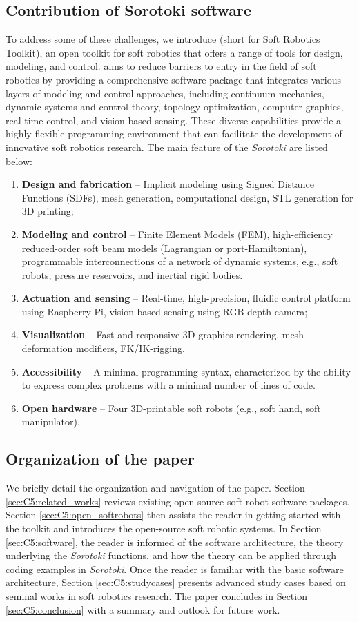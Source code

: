 \subsection{Contribution of Sorotoki software}
To address some of these challenges, we introduce \sorotoki (short for Soft Robotics Toolkit), an open \matlab toolkit for soft robotics that offers a range of tools for design, modeling, and control. \sorotoki aims to reduce barriers to entry in the field of soft robotics by providing a comprehensive software package that integrates various layers of modeling and control approaches, including continuum mechanics, dynamic systems and control theory, topology optimization, computer graphics, real-time control, and vision-based sensing. These diverse capabilities provide a highly flexible programming environment that can facilitate the development of innovative soft robotics research. The main feature of the \textit{Sorotoki} are listed below:
%
\begin{enumerate}
    \setlength\itemsep{0.0em}
    \item \textbf{Design and fabrication} -- Implicit modeling using Signed Distance Functions (SDFs), mesh generation, computational design, STL generation for 3D printing;
    \item \textbf{Modeling and control} -- Finite Element Models (FEM), high-efficiency reduced-order soft beam models (Lagrangian or port-Hamiltonian), programmable interconnections of a network of dynamic systems, e.g., soft robots, pressure reservoirs, and inertial rigid bodies.
    \item \textbf{Actuation and sensing} -- Real-time, high-precision, fluidic control platform using Raspberry Pi, vision-based sensing using RGB-depth camera;
    \item \textbf{Visualization} -- Fast and responsive 3D graphics rendering, mesh deformation modifiers, FK/IK-rigging.
    \item \textbf{Accessibility} -- A minimal programming syntax, characterized by the ability to express complex problems with a minimal number of lines of code.
    \item \textbf{Open hardware} -- Four 3D-printable soft robots (e.g., soft hand, soft manipulator).
\end{enumerate}
%

\subsection{Organization of the paper}
We briefly detail the organization and navigation of the paper. Section \ref{sec:C5:related_works} reviews existing open-source soft robot software packages. Section \ref{sec:C5:open_softrobots} then assists the reader in getting started with the toolkit and introduces the open-source soft robotic systems. In Section \ref{sec:C5:software}, the reader is informed of the software architecture, the theory underlying the \textit{Sorotoki} functions, and how the theory can be applied through coding examples in \textit{Sorotoki}. Once the reader is familiar with the basic software architecture, Section \ref{sec:C5:studycases} presents advanced study cases based on seminal works in soft robotics research. The paper concludes in Section \ref{sec:C5:conclusion} with a summary and outlook for future work.
